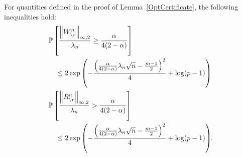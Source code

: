 \begin{lemma}
For quantities defined in the proof of Lemma~\ref{OptCertificate}, the following inequalities hold:
\begin{equation}
\begin{aligned}
&\mathbb{P}\left[\frac{\left\|W_{\backslash r}^n\right\|_{\infty,2}}{\lambda_n} \geq \frac{\alpha}{4(2-\alpha)}\right]\\ &\quad\leq 2\exp\left(-\frac{\left(\frac{\alpha}{4(2-\alpha)}\lambda_n\sqrt{n} - \frac{m-1}{2}\right)^2}{4}+\log(p-1)\right)\\
&\mathbb{P}\left[\frac{\left\|R_{\backslash r}^n\right\|_{\infty,2}}{\lambda_n}>\frac{\alpha}{4(2-\alpha)}\right]\\ &\quad\leq 2\exp\left(-\frac{\left(\frac{\alpha}{4(2-\alpha)}\lambda_n\sqrt{n} - \frac{m-1}{2}\right)^2}{4}+\log(p-1)\right)\!\!.\\
\end{aligned}
\nonumber
\end{equation}
\label{generalbounds}
\end{lemma}

